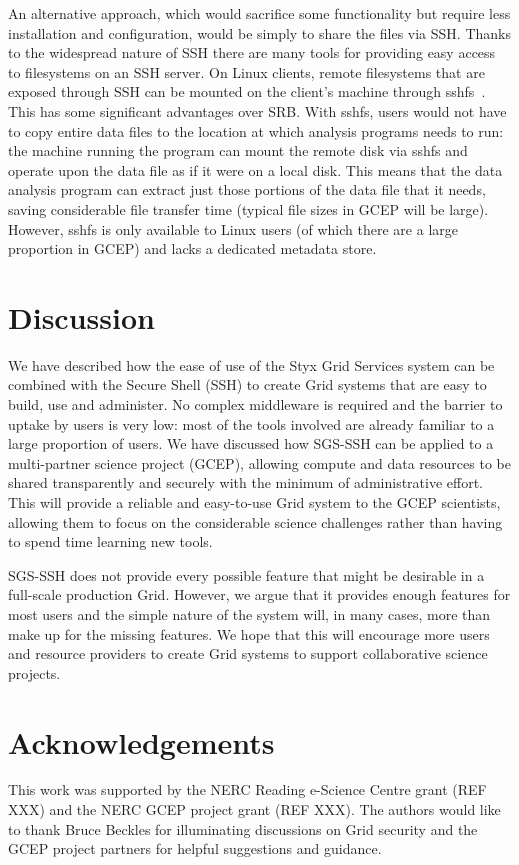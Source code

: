 \documentclass[a4paper]{article}
\begin{document}
\begin{multicols}{2}
An alternative approach, which would sacrifice some functionality but require less installation and configuration, would be simply to share the files via SSH.  Thanks to the widespread nature of SSH there are many tools for providing easy access to filesystems on an SSH server.  On Linux clients, remote filesystems that are exposed through SSH can be mounted on the client's machine through sshfs~\cite{sshfs}.  This has some significant advantages over SRB.  With sshfs, users would not have to copy entire data files to the location at which analysis programs needs to run: the machine running the program can mount the remote disk via sshfs and operate upon the data file as if it were on a local disk.  This means that the data analysis program can extract just those portions of the data file that it needs, saving considerable file transfer time (typical file sizes in GCEP will be large).  However, sshfs is only available to Linux users (of which there are a large proportion in GCEP) and lacks a dedicated metadata store.

\section{Discussion}
We have described how the ease of use of the Styx Grid Services system can be combined with the Secure Shell (SSH) to create Grid systems that are easy to build, use and administer.  No complex middleware is required and the barrier to uptake by users is very low: most of the tools involved are already familiar to a large proportion of users.  We have discussed how SGS-SSH can be applied to a multi-partner science project (GCEP), allowing compute and data resources to be shared transparently and securely with the minimum of administrative effort.  This will provide a reliable and easy-to-use Grid system to the GCEP scientists, allowing them to focus on the considerable science challenges rather than having to spend time learning new tools.

SGS-SSH does not provide every possible feature that might be desirable in a full-scale production Grid.  However, we argue that it provides enough features for most users and the simple nature of the system will, in many cases, more than make up for the missing features.  We hope that this will encourage more users and resource providers to create Grid systems to support collaborative science projects.

\section*{Acknowledgements}
This work was supported by the NERC Reading e-Science Centre grant (REF XXX) and the NERC GCEP project grant (REF XXX).  The authors would like to thank Bruce Beckles for illuminating discussions on Grid security and the GCEP project partners for helpful suggestions and guidance.

\end{multicols}



\end{document}
